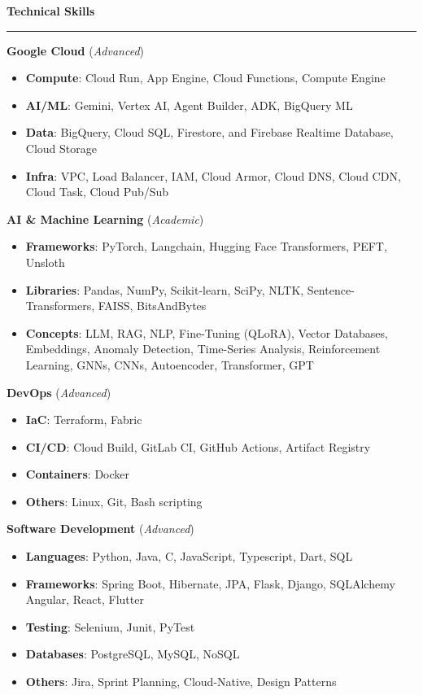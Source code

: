\documentclass[9pt, a4paper]{article}
\newcommand{\cvsection}[1]{%
	\vspace{2pt}\par
	{\Large\bfseries\color{sectionblue}#1}\par
	\vspace{2pt}\hrule\vspace{6pt}
}
\begin{document}
\begin{minipage}[t]{0.32\linewidth}
		\cvsection{Technical Skills}
		
		{\bfseries Google Cloud} (\textit{Advanced})
		\begin{itemize}[leftmargin=*, nosep, itemsep=2pt]
			\footnotesize
			\item \textbf{Compute}: Cloud Run, App Engine, Cloud Functions, Compute Engine
			\item \textbf{AI/ML}: Gemini, Vertex AI, Agent Builder, ADK, BigQuery ML
			\item \textbf{Data}: BigQuery, Cloud SQL, Firestore, and Firebase Realtime Database, Cloud Storage
			\item \textbf{Infra}: VPC, Load Balancer, IAM, Cloud Armor, Cloud DNS, Cloud CDN, Cloud Task, Cloud Pub/Sub
		\end{itemize}
		\vspace{5pt}
		
		{\bfseries AI \& Machine Learning} (\textit{Academic})
		\begin{itemize}[leftmargin=*, nosep, itemsep=2pt]
			\footnotesize
			\item \textbf{Frameworks}: PyTorch, Langchain, Hugging Face Transformers, PEFT, Unsloth
			\item \textbf{Libraries}: Pandas, NumPy, Scikit-learn, SciPy, NLTK, Sentence-Transformers, FAISS, BitsAndBytes
			\item \textbf{Concepts}: LLM, RAG, NLP, Fine-Tuning (QLoRA), Vector Databases, Embeddings, Anomaly Detection, Time-Series Analysis, Reinforcement Learning, GNNs, CNNs, Autoencoder, Transformer, GPT
		\end{itemize}
		\vspace{5pt}
		
		{\bfseries DevOps} (\textit{Advanced})
		\begin{itemize}[leftmargin=*, nosep, itemsep=2pt]
			\footnotesize
			\item \textbf{IaC}: Terraform, Fabric
			\item \textbf{CI/CD}: Cloud Build, GitLab CI, GitHub Actions, Artifact Registry
			\item \textbf{Containers}: Docker
			\item \textbf{Others}: Linux, Git, Bash scripting
		\end{itemize}
		\vspace{5pt}
		
		{\bfseries Software Development} (\textit{Advanced})
		\begin{itemize}[leftmargin=*, nosep, itemsep=2pt]
			\footnotesize
			\item \textbf{Languages}: Python, Java, C, JavaScript, Typescript, Dart, SQL
			\item \textbf{Frameworks}: Spring Boot, Hibernate, JPA, Flask, Django, SQLAlchemy Angular, React, Flutter
			\item \textbf{Testing}: Selenium, Junit, PyTest
			\item \textbf{Databases}: PostgreSQL, MySQL, NoSQL
			\item \textbf{Others}: Jira, Sprint Planning, Cloud-Native, Design Patterns
		\end{itemize}
		\vspace{7pt}
		

\end{minipage}
\end{document}
